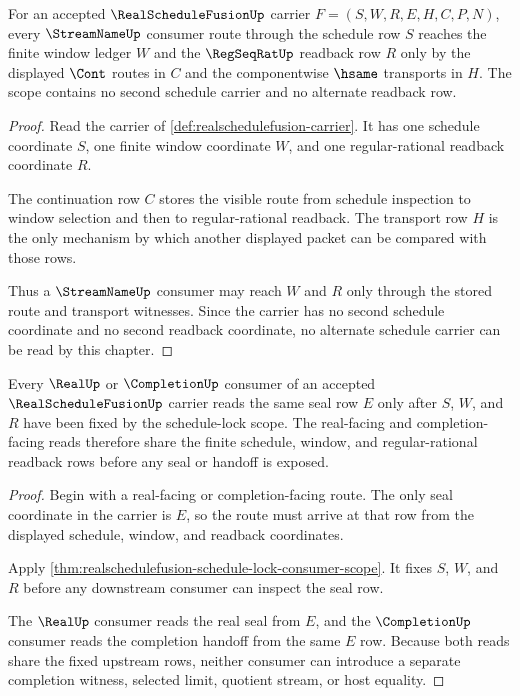 \begin{theorem}
\label{thm:realschedulefusion-schedule-lock-consumer-scope}
For an accepted $\RealScheduleFusionUp$ carrier $F=(S,W,R,E,H,C,P,N)$, every $\StreamNameUp$ consumer route through the schedule row $S$ reaches the finite window ledger $W$ and the $\RegSeqRatUp$ readback row $R$ only by the displayed $\Cont$ routes in $C$ and the componentwise $\hsame$ transports in $H$. The scope contains no second schedule carrier and no alternate readback row.
\end{theorem}
\begin{proof}
Read the carrier of \autoref{def:realschedulefusion-carrier}. It has one schedule coordinate $S$, one finite window coordinate $W$, and one regular-rational readback coordinate $R$.

The continuation row $C$ stores the visible route from schedule inspection to window selection and then to regular-rational readback. The transport row $H$ is the only mechanism by which another displayed packet can be compared with those rows.

Thus a $\StreamNameUp$ consumer may reach $W$ and $R$ only through the stored route and transport witnesses. Since the carrier has no second schedule coordinate and no second readback coordinate, no alternate schedule carrier can be read by this chapter.
\end{proof}

\begin{theorem}
\label{thm:realschedulefusion-real-completion-consumer-scope}
Every $\RealUp$ or $\CompletionUp$ consumer of an accepted $\RealScheduleFusionUp$ carrier reads the same seal row $E$ only after $S$, $W$, and $R$ have been fixed by the schedule-lock scope. The real-facing and completion-facing reads therefore share the finite schedule, window, and regular-rational readback rows before any seal or handoff is exposed.
\end{theorem}
\begin{proof}
Begin with a real-facing or completion-facing route. The only seal coordinate in the carrier is $E$, so the route must arrive at that row from the displayed schedule, window, and readback coordinates.

Apply \autoref{thm:realschedulefusion-schedule-lock-consumer-scope}. It fixes $S$, $W$, and $R$ before any downstream consumer can inspect the seal row.

The $\RealUp$ consumer reads the real seal from $E$, and the $\CompletionUp$ consumer reads the completion handoff from the same $E$ row. Because both reads share the fixed upstream rows, neither consumer can introduce a separate completion witness, selected limit, quotient stream, or host equality.
\end{proof}

